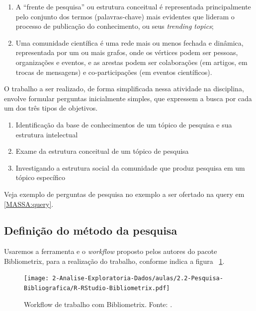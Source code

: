 \begin{enumerate}
    \item A ``frente de pesquisa'' ou estrutura conceitual é representada principalmente pelo conjunto dos termos (palavras-chave) mais evidentes que lideram o processo de publicação do conhecimento, ou seus \textit{trending topics};
    \item Uma comunidade científica é uma rede mais ou menos fechada e dinâmica, representada por um ou mais grafos, onde os vértices podem ser pessoas, organizações e eventos, e as arestas podem ser colaborações (em artigos, em trocas de mensagens) e co-participações (em eventos científicos).
\end{enumerate}

O trabalho a ser realizado, de forma simplificada nessa atividade na disciplina, envolve  formular perguntas inicialmente simples, que expressem a busca por cada um dos três tipos de objetivos.

\begin{enumerate}
\item Identificação da base de conhecimentos de um tópico de pesquisa e sua estrutura intelectual

\item Exame da estrutura conceitual de um tópico de pesquisa

\item Investigando a estrutura social da comunidade que produz pesquisa em um tópico específico
\end{enumerate}

Veja exemplo de perguntas de pesquisa no exemplo a ser ofertado na query em \ref{MASSA:query}.

\subsection{Definição do método da pesquisa}

Usaremos a ferramenta e o \textit{workflow} proposto pelos autores do pacote Bibliometrix, para a realização do trabalho, conforme indica a figura ~\ref{fig:bibliometrix:workflow}.

\begin{figure}
    \centering
\texttt{[image: 2-Analise-Exploratoria-Dados/aulas/2.2-Pesquisa-Bibliografica/R-RStudio-Bibliometrix.pdf]}
    \caption{Workflow de trabalho com Bibliometrix. Fonte: \citep{aria_bibliometrix_2017}.\label{fig:bibliometrix:workflow}}
    
\end{figure}

